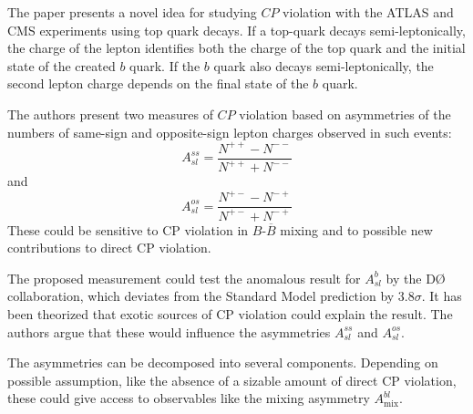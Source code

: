 

\captionsetup{width=0.45\textwidth}




\noindent
The paper\cite{paper} presents a novel idea for studying $C\!P$ violation with the ATLAS and CMS experiments using top quark decays.
If a top-quark decays semi-leptonically, the charge of the lepton identifies both the charge of the top quark and the initial state of the created $b$ quark.
If the $b$ quark also decays semi-leptonically, the second lepton charge depends on the final state of the $b$ quark.

The authors present two measures of $C\!P$ violation based on asymmetries of the numbers of same-sign and opposite-sign lepton charges observed in such events:
\begin{equation}
  A^{ss}_{sl} = \frac{N^{++} - N^{--}}{N^{++} + N^{--}}
\end{equation}
and
\begin{equation}
  A^{os}_{sl} = \frac{N^{+-} - N^{-+}}{N^{+-} + N^{-+}}
\end{equation}
These could be sensitive to CP violation in $B$-$\overline{B}$ mixing and to possible new contributions to direct CP violation.

The proposed measurement could test the anomalous result for $A^b_{sl}$ by the DØ collaboration, which deviates from the Standard Model prediction by $3.8σ$.
It has been theorized that exotic sources of CP violation could explain the result.
The authors argue that these would influence the asymmetries $A^{ss}_{sl}$ and $A^{os}_{sl}$.

The asymmetries can be decomposed into several components.
Depending on possible assumption, like the absence of a sizable amount of direct CP violation, these could give access to observables like the mixing asymmetry $A^{bl}_\text{mix}$.

